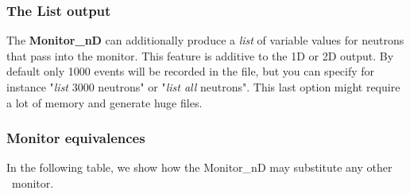 \subsubsection{The List output}

The {\bf Monitor\_nD} can additionally produce a {\it list} of variable
values for neutrons that pass into the monitor. This feature is additive
to the 1D or 2D output. By default only 1000 events will be recorded in
the file, but you can specify for instance "{\it list} 3000 neutrons" or
"{\it list all} neutrons". This last option might require a lot of
memory and generate huge files.

\subsubsection{Monitor equivalences}

In the following table, we show how the Monitor\_nD may substitute any other \MCS\ monitor.

